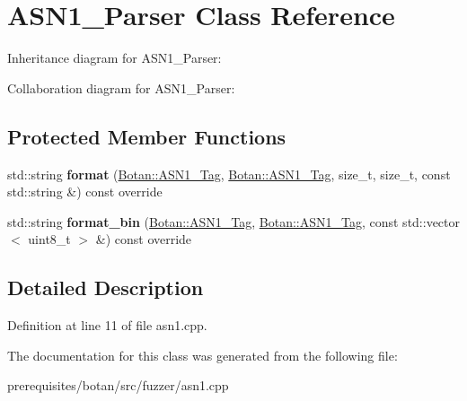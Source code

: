 \hypertarget{class_a_s_n1___parser}{}\section{A\+S\+N1\+\_\+\+Parser Class Reference}
\label{class_a_s_n1___parser}


Inheritance diagram for A\+S\+N1\+\_\+\+Parser\+:


Collaboration diagram for A\+S\+N1\+\_\+\+Parser\+:
\subsection*{Protected Member Functions}
\begin{DoxyCompactItemize}
\item 
\mbox{\label{class_a_s_n1___parser_a1fb4a5453ed15ec3637da95e0b449007}} 
std\+::string {\bfseries format} (\mbox{\hyperlink{namespace_botan_acc1ab433420bdddbcfe52dbbd94e8576}{Botan\+::\+A\+S\+N1\+\_\+\+Tag}}, \mbox{\hyperlink{namespace_botan_acc1ab433420bdddbcfe52dbbd94e8576}{Botan\+::\+A\+S\+N1\+\_\+\+Tag}}, size\+\_\+t, size\+\_\+t, const std\+::string \&) const override
\item 
\mbox{\label{class_a_s_n1___parser_aeda25be8d7c52a7eba9307491640c037}} 
std\+::string {\bfseries format\+\_\+bin} (\mbox{\hyperlink{namespace_botan_acc1ab433420bdddbcfe52dbbd94e8576}{Botan\+::\+A\+S\+N1\+\_\+\+Tag}}, \mbox{\hyperlink{namespace_botan_acc1ab433420bdddbcfe52dbbd94e8576}{Botan\+::\+A\+S\+N1\+\_\+\+Tag}}, const std\+::vector$<$ uint8\+\_\+t $>$ \&) const override
\end{DoxyCompactItemize}


\subsection{Detailed Description}


Definition at line 11 of file asn1.\+cpp.



The documentation for this class was generated from the following file\+:\begin{DoxyCompactItemize}
\item 
prerequisites/botan/src/fuzzer/asn1.\+cpp\end{DoxyCompactItemize}

